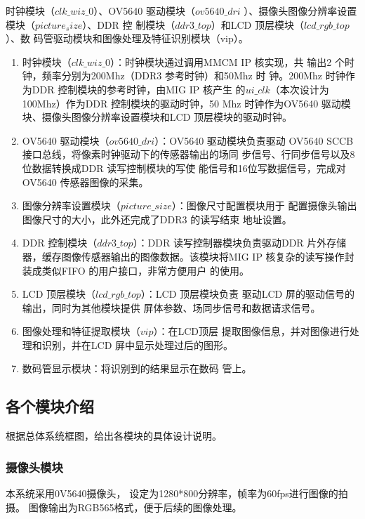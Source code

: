 \documentclass[UTF-8, a4paper, 12pt]{ctexart}
\begin{document}
时钟模块（$clk\_wiz\_0$）、OV5640 驱动模块（$ov5640\_dri$
）、摄像头图像分辨率设置模块（$picture_size$）、DDR 控
制模块（$ddr3\_top$）和LCD 顶层模块（$lcd\_rgb\_top$）、数
码管驱动模块和图像处理及特征识别模块（vip）。
\begin{enumerate}
    \item 时钟模块（$clk\_wiz\_0$）：时钟模块通过调用MMCM IP 核实现，共
输出2 个时钟，频率分别为200Mhz（DDR3 参考时钟）和50Mhz 时
钟。200Mhz 时钟作为DDR 控制模块的参考时钟，由MIG IP 核产生
的$ui\_clk$（本次设计为100Mhz）作为DDR 控制模块的驱动时钟，50
Mhz 时钟作为OV5640 驱动模块、摄像头图像分辨率设置模块和LCD
顶层模块的驱动时钟。
\item OV5640 驱动模块（$ov5640\_dri$）：OV5640 驱动模块负责驱动
OV5640 SCCB 接口总线，将像素时钟驱动下的传感器输出的场同
步信号、行同步信号以及8 位数据转换成DDR 读写控制模块的写使
能信号和16位写数据信号，完成对OV5640 传感器图像的采集。
\item 图像分辨率设置模块（$picture\_size$）：图像尺寸配置模块用于
配置摄像头输出图像尺寸的大小，此外还完成了DDR3 的读写结束
地址设置。
\item DDR 控制模块（$ddr3\_top$）：DDR 读写控制器模块负责驱动DDR
片外存储器，缓存图像传感器输出的图像数据。该模块将MIG IP
核复杂的读写操作封装成类似FIFO 的用户接口，非常方便用户
的使用。
\item LCD 顶层模块（$lcd\_rgb\_top$）：LCD 顶层模块负责
驱动LCD 屏的驱动信号的输出，同时为其他模块提供
屏体参数、场同步信号和数据请求信号。
\item 图像处理和特征提取模块（$vip$）：在LCD顶层
提取图像信息，并对图像进行处理和识别，并在LCD
屏中显示处理过后的图形。
\item 数码管显示模块：将识别到的结果显示在数码
管上。
\end{enumerate}













\subsection{各个模块介绍}

根据总体系统框图，给出各模块的具体设计说明。
\subsubsection{摄像头模块}
    本系统采用0V5640摄像头，
    设定为1280*800分辨率，帧率为60fps进行图像的拍摄。
    图像输出为RGB565格式，便于后续的图像处理。
\end{document}
